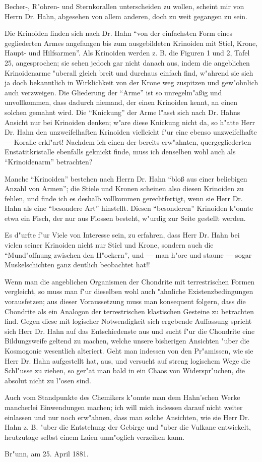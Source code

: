 \documentclass[a4paper, 12pt, oneside]{article}
\begin{document}
Becher-, R"ohren- und Sternkorallen unterscheiden zu wollen, scheint mir von Herrn Dr. Hahn, abgesehen von allem anderen, doch zu weit gegangen zu sein.

Die Krinoiden finden sich nach Dr. Hahn "`von der einfachsten Form eines gegliederten Armes angefangen bis zum ausgebildeten Krinoiden mit Stiel, Krone, Haupt- und Hilfsarmen"'. Als Krinoiden werden z. B. die Figuren 1 und 2, Tafel 25, angesprochen; sie sehen jedoch gar nicht danach aus, indem die angeblichen Krinoidenarme "uberall gleich breit und durchaus einfach find, w"ahrend sie sich ja doch bekanntlich in Wirklichkeit von der Krone weg zuspitzen und gew"ohnlich auch verzweigen. Die Gliederung der "`Arme"' ist so unregelm"aßig und unvollkommen, dass dadurch niemand, der einen Krinoiden kennt, an einen solchen gemahnt wird. Die "`Knickung"' der Arme l"asst sich nach Dr. Hahns Ansicht nur bei Krinoiden denken; w"are diese Knickung nicht da, so h"atte Herr Dr. Hahn den unzweifelhaften Krinoiden vielleicht f"ur eine ebenso unzweifelhafte — Koralle erkl"art! Nachdem ich einen der bereits erw"ahnten, quergegliederten Enstatitkristalle ebenfalls geknickt finde, muss ich denselben wohl auch als "`Krinoidenarm"' betrachten?

Manche "`Krinoiden"' bestehen nach Herrn Dr. Hahn "`bloß aus einer beliebigen Anzahl von Armen"'; die Stiele und Kronen scheinen also diesen Krinoiden zu fehlen, und finde ich es deshalb vollkommen gerechtfertigt, wenn sie Herr Dr. Hahn als eine "`besondere Art"' hinstellt. Diesen "`besonderen"' Krinoiden k"onnte etwa ein Fisch, der nur aus Flossen besteht, w"urdig zur Seite gestellt werden.

Es d"urfte f"ur Viele von Interesse sein, zu erfahren, dass Herr Dr. Hahn bei vielen seiner Krinoiden nicht nur Stiel und Krone, sondern auch die "`Mund"offnung zwischen den H"ockern"', und — man h"ore und staune — sogar Muskelschichten ganz deutlich beobachtet hat!!

Wenn man die angeblichen Organismen der Chondrite mit terrestrischen Formen vergleicht, so muss man f"ur dieselben wohl auch "ahnliche Existenzbedingungen vorausfetzen; aus dieser Voraussetzung muss man konsequent folgern, dass die Chondrite als ein Analogon der terrestrischen klastischen Gesteine zu betrachten find. Gegen diese mit logischer Notwendigkeit sich ergebende Auffassung spricht sich Herr Dr. Hahn auf das Entschiedenste aus und sucht f"ur die Chondrite eine Bildungsweife geltend zu machen, welche unsere bisherigen Ansichten "uber die Kosmogonie wesentlich alteriert. Geht man indessen von den Pr"amissen, wie sie Herr Dr. Hahn aufgestellt hat, aus, und versucht auf streng logischem Wege die Schl"usse zu ziehen, so ger"at man bald in ein Chaos von Widerspr"uchen, die absolut nicht zu l"osen sind.

Auch vom Standpunkte des Chemikers k"onnte man dem Hahn'schen Werke mancherlei Einwendungen machen; ich will mich indessen darauf nicht weiter einlassen und nur noch erw"ahnen, dass man solche Ansichten, wie sie Herr Dr. Hahn z. B. "uber die Entstehung der Gebirge und "uber die Vulkane entwickelt, heutzutage selbst einem Laien unm"oglich verzeihen kann.

Br"unn, am 25. April 1881.
\end{document}
